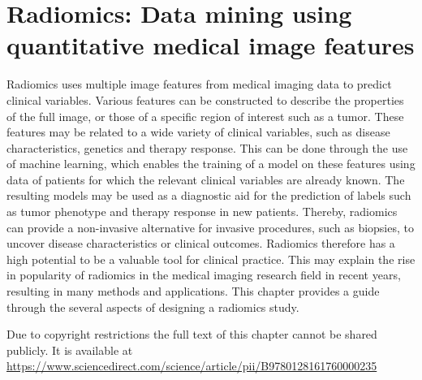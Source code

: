 \chapter[Radiomics: Data mining using quantitative medical image features][Radiomics]{Radiomics: Data mining using quantitative medical image features}\label{chap:radiomics}

\begin{ChapterAbstract}
Radiomics uses multiple image features from medical imaging data to predict clinical variables.
Various features can be constructed to describe the properties of the full image, or those of a specific region of interest such as a tumor.
These features may be related to a wide variety of clinical variables, such as disease characteristics, genetics and therapy response.
This can be done through the use of machine learning, which enables the training of a model on these features using data of patients for which the relevant clinical variables are already known.
The resulting models may be used as a diagnostic aid for the prediction of labels such as tumor phenotype and therapy response in new patients.
Thereby, radiomics can provide a non-invasive alternative for invasive procedures, such as biopsies, to uncover disease characteristics or clinical outcomes.
Radiomics therefore has a high potential to be a valuable tool for clinical practice.
This may explain the rise in popularity of radiomics in the medical imaging research field in recent years, resulting in many methods and applications.
This chapter provides a guide through the several aspects of designing a radiomics study.

\end{ChapterAbstract}

Due to copyright restrictions the full text of this chapter cannot be shared publicly. It is available at \url{https://www.sciencedirect.com/science/article/pii/B9780128161760000235}
